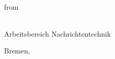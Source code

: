 \thispagestyle{empty}
\vfill

\begin{huge}
  \begin{bf}
    \centerline{%
     }
  \end{bf}
\end{huge}
\vfill

\begin{center}
  \begin{LARGE}
    \Arbeitsart\\
    from\\
    {\sc \Autor}\\
  \end{LARGE}
    \vfill
    \vfill
    \vfill
	\vfill

  \begin{Large}
    Arbeitsbereich Nachrichtentechnik\\
    \vfill

    Bremen, \Berichtsdatum
  \end{Large}
\end{center}
\vfill
\clearemptydoublepage


\thispagestyle{empty}
\vfill

\vfill

